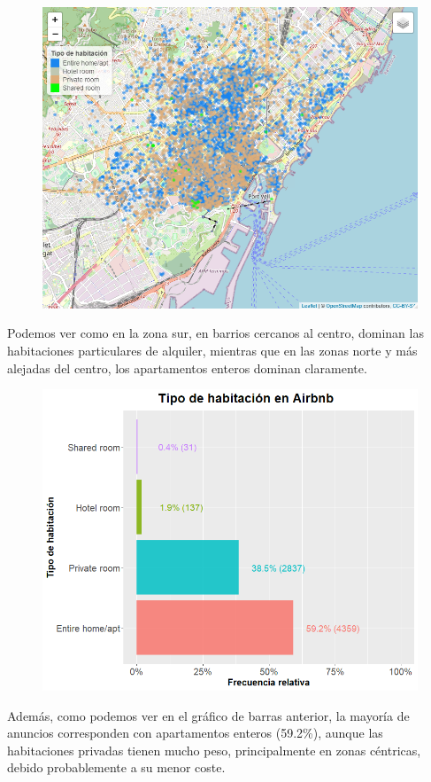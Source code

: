 \documentclass{article}
\begin{document}
\vspace{0.35cm}
\begin{figure}[h]
\hspace*{-0.15cm}
\centering
\includegraphics[scale = 0.4]{room_type}
\end{figure}
\vspace{0.35cm}

Podemos ver como en la zona sur, en barrios cercanos al centro, dominan las habitaciones particulares de alquiler, mientras que en las zonas norte y más alejadas del centro, los apartamentos enteros dominan claramente.

\vspace{0.35cm}
\begin{figure}[h]
\hspace*{-0.15cm}
\centering
\includegraphics[scale = 0.5]{gráfico_room_type}
\end{figure}
\vspace{0.15cm}
Además, como podemos ver en el gráfico de barras anterior, la mayoría de anuncios corresponden con apartamentos enteros (59.2\%), aunque las habitaciones privadas tienen mucho peso, principalmente en zonas céntricas, debido probablemente a su menor coste.
\end{document}
